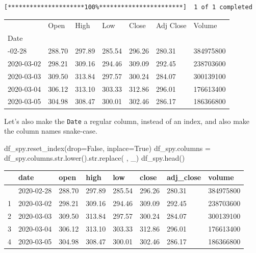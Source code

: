 \documentclass[
  letterpaper,
  DIV=11,
  numbers=noendperiod]{scrreprt}
\newenvironment{Shaded}{\begin{snugshade}}{\end{snugshade}}
\newcommand{\BuiltInTok}[1]{\textcolor[rgb]{0.00,0.23,0.31}{#1}}
\newcommand{\NormalTok}[1]{\textcolor[rgb]{0.00,0.23,0.31}{#1}}
\newcommand{\OperatorTok}[1]{\textcolor[rgb]{0.37,0.37,0.37}{#1}}
\newcommand{\StringTok}[1]{\textcolor[rgb]{0.13,0.47,0.30}{#1}}
\newcommand{\VariableTok}[1]{\textcolor[rgb]{0.07,0.07,0.07}{#1}}
\begin{document}
\begin{verbatim}
[*********************100%***********************]  1 of 1 completed
\end{verbatim}

\begin{longtable}[]{@{}lllllll@{}}
\toprule\noalign{}
& Open & High & Low & Close & Adj Close & Volume \\
Date & & & & & & \\
\midrule\noalign{}
\endhead
\bottomrule\noalign{}
\endlastfoot
2020-02-28 & 288.70 & 297.89 & 285.54 & 296.26 & 280.31 & 384975800 \\
2020-03-02 & 298.21 & 309.16 & 294.46 & 309.09 & 292.45 & 238703600 \\
2020-03-03 & 309.50 & 313.84 & 297.57 & 300.24 & 284.07 & 300139100 \\
2020-03-04 & 306.12 & 313.10 & 303.33 & 312.86 & 296.01 & 176613400 \\
2020-03-05 & 304.98 & 308.47 & 300.01 & 302.46 & 286.17 & 186366800 \\
\end{longtable}

Let's also make the \texttt{Date} a regular column, instead of an index,
and also make the column names snake-case.

\begin{Shaded}
\begin{Highlighting}[]
\NormalTok{df\_spy.reset\_index(drop}\OperatorTok{=}\VariableTok{False}\NormalTok{, inplace}\OperatorTok{=}\VariableTok{True}\NormalTok{)}
\NormalTok{df\_spy.columns }\OperatorTok{=}\NormalTok{ df\_spy.columns.}\BuiltInTok{str}\NormalTok{.lower().}\BuiltInTok{str}\NormalTok{.replace(}\StringTok{\textquotesingle{} \textquotesingle{}}\NormalTok{, }\StringTok{\textquotesingle{}\_\textquotesingle{}}\NormalTok{)}
\NormalTok{df\_spy.head()}
\end{Highlighting}
\end{Shaded}

\begin{longtable}[]{@{}llllllll@{}}
\toprule\noalign{}
& date & open & high & low & close & adj\_close & volume \\
\midrule\noalign{}
\endhead
\bottomrule\noalign{}
\endlastfoot
0 & 2020-02-28 & 288.70 & 297.89 & 285.54 & 296.26 & 280.31 &
384975800 \\
1 & 2020-03-02 & 298.21 & 309.16 & 294.46 & 309.09 & 292.45 &
238703600 \\
2 & 2020-03-03 & 309.50 & 313.84 & 297.57 & 300.24 & 284.07 &
300139100 \\
3 & 2020-03-04 & 306.12 & 313.10 & 303.33 & 312.86 & 296.01 &
176613400 \\
4 & 2020-03-05 & 304.98 & 308.47 & 300.01 & 302.46 & 286.17 &
186366800 \\
\end{longtable}
\end{document}
